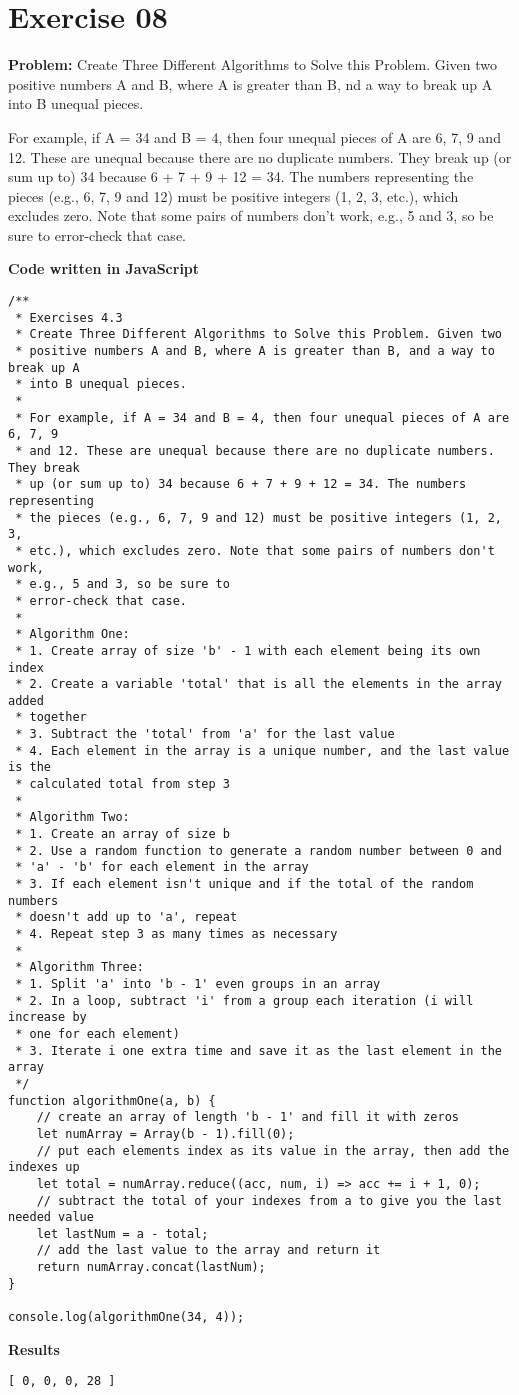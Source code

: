 \documentclass[paper=a4, fontsize=11pt]{scrartcl} %
\numberwithin{equation}{section} %
\numberwithin{figure}{section} %
\numberwithin{table}{section} %
\begin{document}
\section{Exercise 08}

\textbf{Problem:} Create Three Different Algorithms to Solve this Problem. Given two positive numbers A and B, where A is greater than B, nd a way to break up A into B unequal pieces.

For example, if A = 34 and B = 4, then four unequal pieces of A are 6, 7, 9 and 12. These are unequal because there are no duplicate numbers. They break up (or sum up to) 34 because 6 + 7 + 9 + 12 = 34. The numbers representing the pieces (e.g., 6, 7, 9 and 12) must be positive integers (1, 2, 3, etc.), which excludes zero. Note that some pairs of numbers don't work, e.g., 5 and 3, so be sure to error-check that case.

\bigskip
\textbf{Code written in JavaScript}
\begin{lstlisting}
/**
 * Exercises 4.3
 * Create Three Different Algorithms to Solve this Problem. Given two
 * positive numbers A and B, where A is greater than B, and a way to break up A
 * into B unequal pieces.
 * 
 * For example, if A = 34 and B = 4, then four unequal pieces of A are 6, 7, 9
 * and 12. These are unequal because there are no duplicate numbers. They break
 * up (or sum up to) 34 because 6 + 7 + 9 + 12 = 34. The numbers representing
 * the pieces (e.g., 6, 7, 9 and 12) must be positive integers (1, 2, 3, 
 * etc.), which excludes zero. Note that some pairs of numbers don't work, 
 * e.g., 5 and 3, so be sure to
 * error-check that case.
 * 
 * Algorithm One:
 * 1. Create array of size 'b' - 1 with each element being its own index
 * 2. Create a variable 'total' that is all the elements in the array added
 * together
 * 3. Subtract the 'total' from 'a' for the last value
 * 4. Each element in the array is a unique number, and the last value is the 
 * calculated total from step 3
 * 
 * Algorithm Two:
 * 1. Create an array of size b
 * 2. Use a random function to generate a random number between 0 and 
 * 'a' - 'b' for each element in the array
 * 3. If each element isn't unique and if the total of the random numbers 
 * doesn't add up to 'a', repeat
 * 4. Repeat step 3 as many times as necessary
 * 
 * Algorithm Three: 
 * 1. Split 'a' into 'b - 1' even groups in an array
 * 2. In a loop, subtract 'i' from a group each iteration (i will increase by 
 * one for each element)
 * 3. Iterate i one extra time and save it as the last element in the array
 */
function algorithmOne(a, b) {
    // create an array of length 'b - 1' and fill it with zeros
    let numArray = Array(b - 1).fill(0);
    // put each elements index as its value in the array, then add the indexes up
    let total = numArray.reduce((acc, num, i) => acc += i + 1, 0);
    // subtract the total of your indexes from a to give you the last needed value
    let lastNum = a - total;
    // add the last value to the array and return it
    return numArray.concat(lastNum);
}

console.log(algorithmOne(34, 4));
\end{lstlisting}

\bigskip
\textbf{Results}
\begin{lstlisting}
[ 0, 0, 0, 28 ]
\end{lstlisting}
\end{document}
